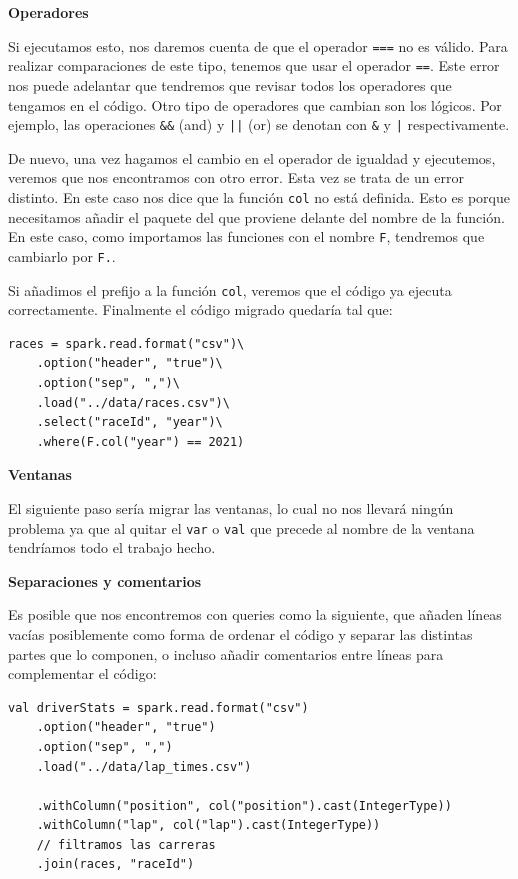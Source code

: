 \documentclass[12pt,twoside,titlepage]{report}
\begin{document}
\textbf{Operadores}

Si ejecutamos esto, nos daremos cuenta de que el operador \texttt{===} no es válido. Para realizar comparaciones de este tipo, tenemos que usar el operador \texttt{==}. Este error nos puede adelantar que tendremos que revisar todos los operadores que tengamos en el código. Otro tipo de operadores que cambian son los lógicos. Por ejemplo, las operaciones \texttt{\&\&} (and) y \texttt{||} (or) se denotan con \texttt{\&} y \texttt{|} respectivamente.

De nuevo, una vez hagamos el cambio en el operador de igualdad y ejecutemos, veremos que nos encontramos con otro error. Esta vez se trata de un error distinto. En este caso nos dice que la función \texttt{col} no está definida. Esto es porque necesitamos añadir el paquete del que proviene delante del nombre de la función. En este caso, como importamos las funciones con el nombre \texttt{F}, tendremos que cambiarlo por \texttt{F.}.

Si añadimos el prefijo a la función \texttt{col}, veremos que el código ya ejecuta correctamente. Finalmente el código migrado quedaría tal que:

\begin{lstlisting}
races = spark.read.format("csv")\
	.option("header", "true")\
	.option("sep", ",")\
	.load("../data/races.csv")\
	.select("raceId", "year")\
	.where(F.col("year") == 2021)
\end{lstlisting}

\textbf{Ventanas}

El siguiente paso sería migrar las ventanas, lo cual no nos llevará ningún problema ya que al quitar el \texttt{var} o \texttt{val} que precede al nombre de la ventana tendríamos todo el trabajo hecho.

\textbf{Separaciones y comentarios}

Es posible que nos encontremos con queries como la siguiente, que añaden líneas vacías posiblemente como forma de ordenar el código y separar las distintas partes que lo componen, o incluso añadir comentarios entre líneas para complementar el código:

\begin{lstlisting}
val driverStats = spark.read.format("csv")
	.option("header", "true")
	.option("sep", ",")
	.load("../data/lap_times.csv")

	.withColumn("position", col("position").cast(IntegerType)) 
	.withColumn("lap", col("lap").cast(IntegerType)) 
	// filtramos las carreras
	.join(races, "raceId")
\end{lstlisting}
\end{document}
